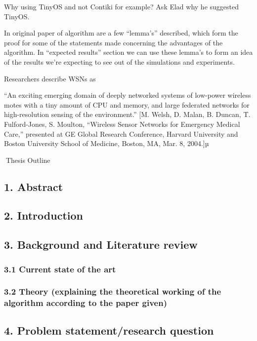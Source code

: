 Why using TinyOS and not Contiki for example? Ask Elad why he suggested
TinyOS.

In original paper of algorithm are a few ``lemma's'' described, which
form the proof for some of the statements made concerning the advantages
of the algorithm. In ``expected results'' section we can use these
lemma's to form an idea of the results we're expecting to see out of the
simulations and experiments.

Researchers describe WSNs as

``An exciting emerging domain of deeply networked systems of low-power
wireless motes with a tiny amount of CPU and memory, and large federated
networks for high-resolution sensing of the environment.'' {[}M. Welsh,
D. Malan, B. Duncan, T. Fulford-Jones, S. Moulton, ``Wireless Sensor
Networks for Emergency Medical Care,'' presented at GE Global Research
Conference, Harvard University and Boston University School of Medicine,
Boston, MA, Mar. 8, 2004.{]}µ

Thesis Outline

\subsection{1. Abstract}\label{abstract}

\subsection{2. Introduction}\label{introduction}

\subsection{3. Background and Literature
review}\label{background-and-literature-review}

\subsubsection{3.1 Current state of the
art}\label{current-state-of-the-art}

\subsubsection{3.2 Theory (explaining the theoretical working of the
algorithm according to the paper
given)}\label{theory-explaining-the-theoretical-working-of-the-algorithm-according-to-the-paper-given}

\subsection{4. Problem statement/research
question}\label{problem-statementresearch-question}

